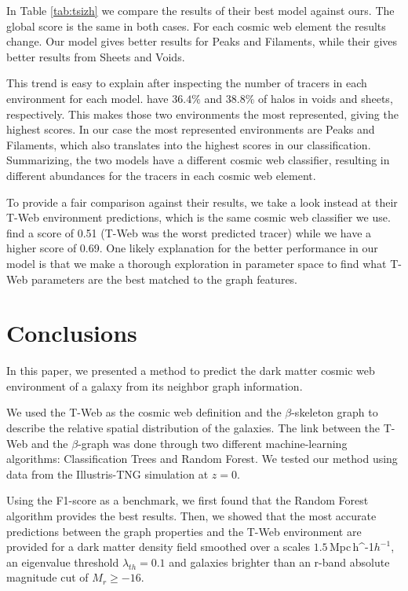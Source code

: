 \documentclass[usenatbib]{mnras}
\newcommand{\Mpch}{\,{\rm Mpc}\,\ifmmode h^{-1}\else $h^{-1}$\fi}
\begin{document}
In Table \ref{tab:tsizh} we compare the results of their best model against ours.
The global score is the same in both cases.
For each cosmic web element the results change.
Our model gives better results for Peaks and Filaments, while their gives better results from Sheets and Voids.

This trend is easy to explain after inspecting the number of tracers in each environment for each model.
\cite{Tsizh2019} have $36.4\%$ and $38.8\%$ of halos in voids and sheets, respectively. 
This makes those two environments the most represented, giving the highest scores.
In our case the most represented environments are Peaks and Filaments, which also translates into the highest scores in our classification.
Summarizing, the two models have a different cosmic web classifier, resulting in different abundances for the tracers in each cosmic web element.

To provide a fair comparison against their results, we take a look instead at their T-Web environment predictions, which is the same cosmic web classifier we use.
\cite{Tsizh2019} find a score of 0.51 (T-Web was the worst predicted tracer) while we have a higher score of 0.69.
One likely explanation for the better performance in our model is that we make a thorough exploration in parameter space to find what T-Web parameters are the best matched to the graph features.


\section{Conclusions}\label{sec:conclusions}

In this paper, we presented a method to predict the dark matter cosmic web environment of a galaxy from its neighbor graph information.

We used the T-Web as the cosmic web definition \citep{Forero-Romero2009} and the $\beta$-skeleton graph \citep{Fang2019} to describe the relative spatial distribution of the galaxies. 
The link between the T-Web and the $\beta$-graph was done through two different machine-learning algorithms: Classification Trees and Random Forest.
We tested our method using data from the Illustris-TNG simulation \citep{Nelson2019} at $z=0$. 

Using the F1-score as a benchmark, we first found that the Random Forest algorithm provides the best results. Then, we showed that the most accurate predictions between the graph properties and the T-Web environment are provided for a dark matter density field smoothed over a scales $1.5$\Mpch, an eigenvalue threshold $\lambda_{th}=0.1$ and galaxies brighter than an r-band absolute magnitude cut of $M_r\geq-16$. 
\end{document}
